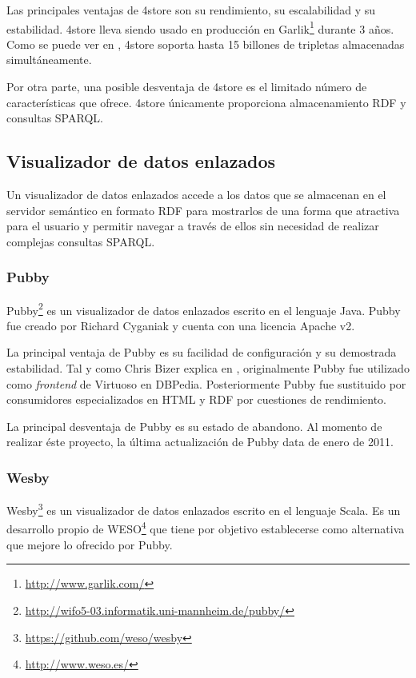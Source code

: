 Las principales ventajas de 4store son su rendimiento, su escalabilidad y su estabilidad. 4store lleva siendo usado en producción en Garlik\footnote{\url{http://www.garlik.com/}} durante 3 años. Como se puede ver en \cite[]{largetriplestores}, 4store soporta hasta 15 billones de tripletas almacenadas simultáneamente.

Por otra parte, una posible desventaja de 4store es el limitado número de características que ofrece. 4store únicamente proporciona almacenamiento RDF y consultas SPARQL.



\subsection{Visualizador de datos enlazados}
Un visualizador de datos enlazados accede a los datos que se almacenan en el servidor semántico en formato RDF para mostrarlos de una forma que atractiva para el usuario y permitir navegar a través de ellos sin necesidad de realizar complejas consultas SPARQL.


\subsubsection{Pubby}
Pubby\footnote{\url{http://wifo5-03.informatik.uni-mannheim.de/pubby/}} es un visualizador de datos enlazados escrito en el lenguaje Java.  Pubby fue creado por Richard Cyganiak y cuenta con una licencia Apache v2.

La principal ventaja de Pubby es su facilidad de configuración y su demostrada estabilidad. Tal y como Chris Bizer explica en \cite[]{dbpedia-architecture}, originalmente Pubby fue utilizado como \textit{frontend} de Virtuoso en DBPedia.  Posteriormente Pubby fue sustituido por consumidores especializados en HTML y RDF por cuestiones de rendimiento.

La principal desventaja de Pubby es su estado de abandono. Al momento de realizar éste proyecto, la última actualización de Pubby data de enero de 2011.

\subsubsection{Wesby}
Wesby\footnote{\url{https://github.com/weso/wesby}} es un visualizador de datos enlazados escrito en el lenguaje Scala. Es un desarrollo propio de WESO\footnote{\url{http://www.weso.es/}} que tiene por objetivo establecerse como alternativa que mejore lo ofrecido por Pubby.

